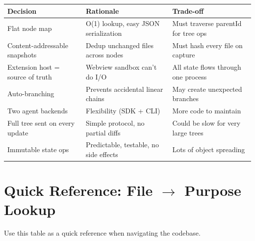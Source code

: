 \documentclass[12pt, a4paper]{article}
\begin{document}
\begin{table}[H]
\centering
\begin{tabular}{@{}p{4cm}p{5cm}p{4.5cm}@{}}
\toprule
\textbf{Decision} & \textbf{Rationale} & \textbf{Trade-off} \\
\midrule
Flat node map & O(1) lookup, easy JSON serialization & Must traverse parentId for tree ops \\[6pt]
Content-addressable snapshots & Dedup unchanged files across nodes & Must hash every file on capture \\[6pt]
Extension host = source of truth & Webview sandbox can't do I/O & All state flows through one process \\[6pt]
Auto-branching & Prevents accidental linear chains & May create unexpected branches \\[6pt]
Two agent backends & Flexibility (SDK + CLI) & More code to maintain \\[6pt]
Full tree sent on every update & Simple protocol, no partial diffs & Could be slow for very large trees \\[6pt]
Immutable state ops & Predictable, testable, no side effects & Lots of object spreading \\
\bottomrule
\end{tabular}
\end{table}

\newpage

\section{Quick Reference: File $\to$ Purpose Lookup}

Use this table as a quick reference when navigating the codebase.
\end{document}
